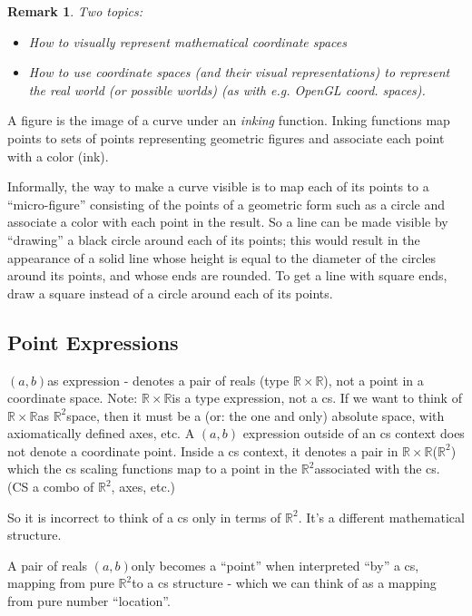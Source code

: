 \documentclass[12pt]{tufte-handout}
\numberwithin{equation}{subsection}
\numberwithin{equation}{subsection}
\newtheorem{remark}{Remark}
\newcommand\cspace{coordinate space}
\newcommand\ab{\((a,b)\)}
\newcommand\RR{\(\mathds{R}\times\mathds{R}\)}
\newcommand\Rtwo{\(\mathds{R}^2\)}
\begin{document}
  \begin{remark}
    Two topics:
    \begin{itemize}
    \item How to visually represent mathematical \cspace{}s
    \item How to use \cspace{}s (and their visual representations) to
      represent the real world (or possible worlds) (as with e.g. OpenGL coord. spaces).
    \end{itemize}
  \end{remark}

  A figure is the image of a curve under an \textit{inking} function.
  Inking functions map points to sets of points representing geometric
  figures and associate each point with a color (ink).

  Informally, the way to make a curve visible is to map each of its
  points to a ``micro-figure'' consisting of the points of a geometric
  form such as a circle and associate a color with each point in the
  result.  So a line can be made visible by ``drawing'' a black circle
  around each of its points; this would result in the appearance of a
  solid line whose height is equal to the diameter of the circles
  around its points, and whose ends are rounded.  To get a line with
  square ends, draw a square instead of a circle around each of its
  points.


  \subsection{Point Expressions}
  \label{subs:pointexprs}

  \ab as expression - denotes a pair of reals (type \RR), not a point in
  a \cspace{}.  Note: \RR is a type expression, not a cs.  If we want to
  think of \RR as \Rtwo space, then it must be a (or: the one and only)
  absolute space, with axiomatically defined axes, etc.  A \ab
  expression outside of an cs context does not denote a coordinate
  point.  Inside a cs context, it denotes a pair in \RR (\Rtwo) which
  the cs scaling functions map to a point in the \Rtwo associated with
  the cs.  (CS a combo of \Rtwo, axes, etc.)

  So it is incorrect to think of a cs only in terms of \Rtwo.  It's a
  different mathematical structure.

  A pair of reals \ab only becomes a ``point'' when interpreted ``by'' a
  cs, mapping from pure \Rtwo to a cs structure - which we can think of
  as a mapping from pure number ``location''.
\end{document}
